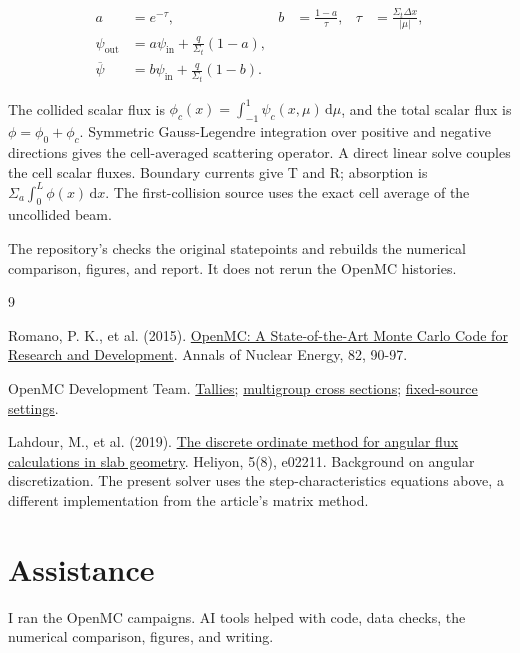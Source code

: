 \documentclass[10pt,letterpaper]{article}
\begin{document}
\begin{align}
a&=e^{-\tau},&
b&=\frac{1-a}{\tau},&
\tau&=\frac{\Sigma_t\Delta x}{|\mu|},\\
\psi_{\mathrm{out}}&=a\psi_{\mathrm{in}}+
  \frac{q}{\Sigma_t}(1-a),\\
\overline\psi&=b\psi_{\mathrm{in}}+
  \frac{q}{\Sigma_t}(1-b).
\end{align}

The collided scalar flux is \(\phi_c(x)=\int_{-1}^{1}\psi_c(x,\mu)\,\mathrm{d}\mu\), and the total scalar flux is \(\phi=\phi_0+\phi_c\). Symmetric Gauss-Legendre integration over positive and negative directions gives the cell-averaged scattering operator. A direct linear solve couples the cell scalar fluxes. Boundary currents give T and R; absorption is \(\Sigma_a\int_0^L\phi(x)\,\mathrm{d}x\). The first-collision source uses the exact cell average of the uncollided beam.


The repository's  checks the original statepoints and rebuilds the numerical comparison, figures, and report. It does not rerun the OpenMC histories.


\begin{thebibliography}{9}

Romano, P. K., et al. (2015). \href{https://doi.org/10.1016/j.anucene.2014.07.048}{OpenMC: A State-of-the-Art Monte Carlo Code for Research and Development}. Annals of Nuclear Energy, 82, 90-97.

OpenMC Development Team. \href{https://docs.openmc.org/en/stable/usersguide/tallies.html}{Tallies}; \href{https://docs.openmc.org/en/stable/pythonapi/generated/openmc.XSdata.html}{multigroup cross sections}; \href{https://docs.openmc.org/en/stable/usersguide/settings.html}{fixed-source settings}.

Lahdour, M., et al. (2019). \href{https://doi.org/10.1016/j.heliyon.2019.e02211}{The discrete ordinate method for angular flux calculations in slab geometry}. Heliyon, 5(8), e02211. Background on angular discretization. The present solver uses the step-characteristics equations above, a different implementation from the article's matrix method.

\end{thebibliography}

\section*{Assistance}

I ran the OpenMC campaigns. AI tools helped with code, data checks, the numerical comparison, figures, and writing.
\end{document}
